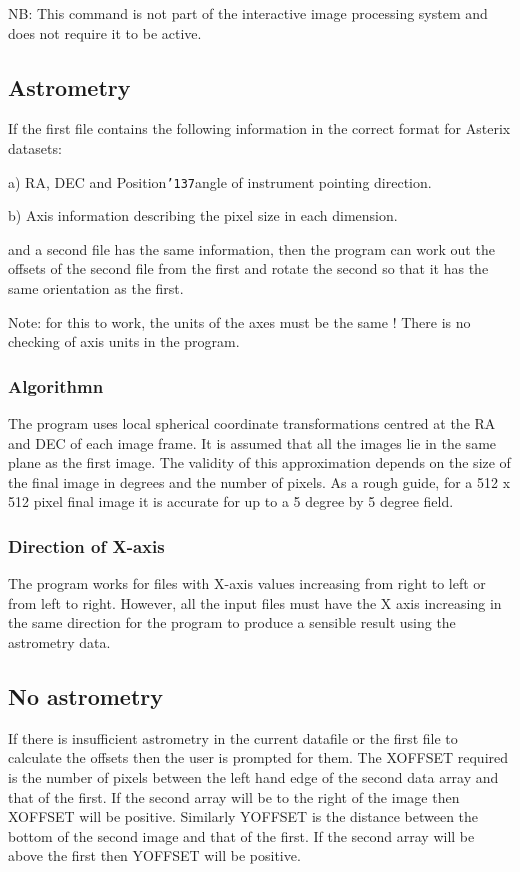 \documentclass{book}
\renewcommand{\_}{{\tt\char'137}}     %
\begin{document}
NB: This command is not part of the interactive image processing
system and does not require it to be active.
\subsection{Astrometry}
If the first file contains the following information in the correct
format for Asterix datasets:
 
a) RA, DEC and Position\_angle of instrument pointing direction.
 
b) Axis information describing the pixel size in each dimension.
 
and a second file has the same information, then the program can work
out the offsets of the second file from the first and rotate the second
so that it has the same orientation as the first.
 
Note: for this to work, the units of the axes must be the same !
There is no checking of axis units in the program.
 
\subsubsection{Algorithmn}
The program uses local spherical coordinate transformations centred at
the RA and DEC of each image frame. It is assumed that all the images
lie in the same plane as the first image. The validity of this
approximation depends on the size of the final image in degrees and
the number of pixels. As a rough guide, for a 512 x 512 pixel final
image it is accurate for up to a 5 degree by 5 degree field.
 
\subsubsection{Direction of X-axis}
The program works for files with X-axis values increasing from right to
left or from left to right. However, all the input files must have the
X axis increasing in the same direction for the program to produce a
sensible result using the astrometry data.
 
\subsection{No astrometry}
If there is insufficient astrometry in the current datafile or the
first file to calculate the offsets then the user is prompted for
them. The XOFFSET required is the number of pixels between the left
hand edge of the second data array and that of the first. If the second
array will be to the right of the image then XOFFSET will be positive.
Similarly YOFFSET is the distance between the bottom of the second
image and that of the first. If the second array will be above the
first then YOFFSET will be positive.
 
\end{document}
